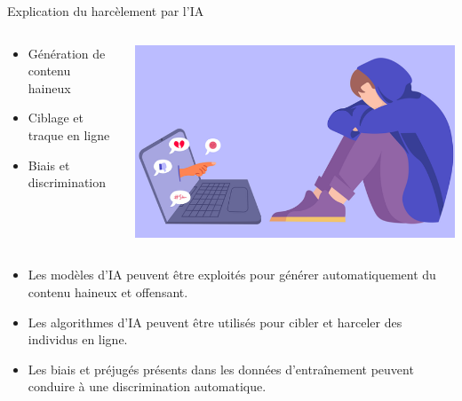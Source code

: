 \documentclass{beamer}
\begin{document}
\begin{frame}{Explication du harcèlement par l'IA}
	\begin{columns}[T]
		\begin{column}{0.6\textwidth}
			\begin{itemize}
				\item Génération de contenu haineux
				\item Ciblage et traque en ligne
				\item Biais et discrimination
			\end{itemize}
		\end{column}
		\begin{column}{0.4\textwidth}
			\includegraphics[width=\textwidth]{harcellement.png}
		\end{column}
	\end{columns}
	
	\vspace{0.5cm}
	
	\begin{itemize}
		\item Les modèles d'IA peuvent être exploités pour générer automatiquement du contenu haineux et offensant.
		\item Les algorithmes d'IA peuvent être utilisés pour cibler et harceler des individus en ligne.
		\item Les biais et préjugés présents dans les données d'entraînement peuvent conduire à une discrimination automatique.
	\end{itemize}
\end{frame}
\end{document}
